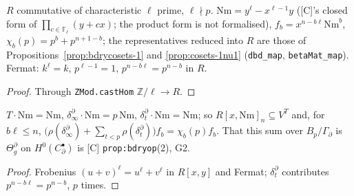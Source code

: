 \begin{definition}\label{def:bdrychar}
  \leanok
  $R$ commutative of characteristic $\ell$ prime, $\ell\nmid p$. $\mathrm{Nm}=y^\ell-x^{\ell-1}y$ ([C]'s closed form of
  $\prod_{c\in\mathbb F_\ell}(y+cx)$; the product form is not formalised), $f_b=x^{n-b\ell}\mathrm{Nm}^b$, $\chi_b(p)=p^b+p^{n+1-b}$; the
  representatives reduced into $R$ are those of Propositions~\ref{prop:bdrycosets-1} and \ref{prop:cosets-1nu1}
  (\texttt{dbd\_map}, \texttt{betaMat\_map}). Fermat: $k^\ell=k$, $p^{\ell-1}=1$, $p^{n-b\ell}=p^{n-b}$ in $R$.
\end{definition}
\begin{proof}
  \leanok
  Through \texttt{ZMod.castHom} $\mathbb Z/\ell\to R$.
\end{proof}

\begin{proposition}\label{prop:bdrychar}
  \leanok
  $T\cdot\mathrm{Nm}=\mathrm{Nm}$, $\delta^\partial_\infty\cdot\mathrm{Nm}=p\,\mathrm{Nm}$, $\delta^\partial_t\cdot\mathrm{Nm}=\mathrm{Nm}$; so
  $R[x,\mathrm{Nm}]_n\subseteq V^T$ and, for $b\ell\le n$,
  $\bigl(\rho(\delta^\partial_\infty)+\sum_{t<p}\rho(\delta^\partial_t)\bigr)f_b=\chi_b(p)f_b$. That this sum over $B_p/\Gamma_\partial$ is
  $\Theta^\partial_g$ on $H^0(C^\bullet_\partial)$ is [C] \texttt{prop:bdryop}(2), G2.
\end{proposition}
\begin{proof}
  \leanok
  Frobenius $(u+v)^\ell=u^\ell+v^\ell$ in $R[x,y]$ and Fermat; $\delta^\partial_t$ contributes $p^{n-b\ell}=p^{n-b}$, $p$ times.
\end{proof}

